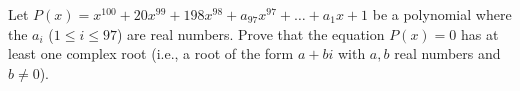 Let $P(x) = x^{100} + 20x^{99} + 198x^{98} + a_{97} x^{97} + \dots + a_1 x + 1$
be a polynomial where the $a_i$ ($1 \leq i \leq 97$) are real numbers. Prove
that the equation $P(x) = 0$ has at least one complex root (i.e., a root of the
form $a + bi$ with $a, b$ real numbers and $b \ne 0$).
